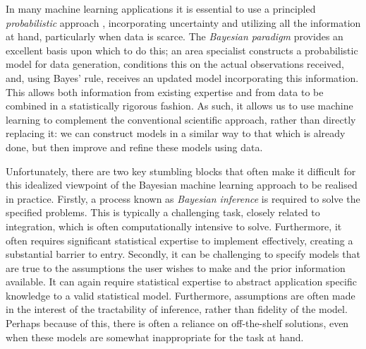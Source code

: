 In many machine learning applications it is essential to use a principled \emph{probabilistic} 
approach \cite{ghahramani2015probabilistic}, incorporating uncertainty and utilizing all the information at hand, 
particularly when data is scarce.  The \emph{Bayesian paradigm} provides an excellent basis upon which to do this; an area 
specialist constructs a probabilistic model for data generation, conditions this on the actual observations received, 
and, using Bayes' rule, receives an updated model incorporating this information.  This
allows both information from existing expertise and from data to be combined in a statistically
rigorous fashion.  As such, it allows us to use machine learning to complement the conventional
scientific approach, rather than directly replacing it: we can construct models in a similar way to
that which is already done, but then improve and refine these models using data.

Unfortunately, there are two key stumbling blocks that often make it difficult for this idealized
viewpoint of the Bayesian machine learning approach to be realised in practice.  Firstly, a process 
known as \emph{Bayesian inference} is
required to solve the specified problems.  This is typically a challenging task, closely 
related to integration, which is often computationally intensive to solve.  Furthermore, it often
requires significant statistical expertise to implement effectively, creating a substantial barrier to
entry.  
Secondly, it can be challenging to specify models that are true to the assumptions the user
wishes to make and the prior information available.  It can again require statistical expertise to abstract
application specific knowledge to a valid statistical model.  Furthermore, assumptions are often made in the interest
of the tractability of inference, rather than fidelity of the model.  Perhaps because of this, there is often
a reliance on off-the-shelf solutions, even when these models are somewhat inappropriate for the task
at hand.



